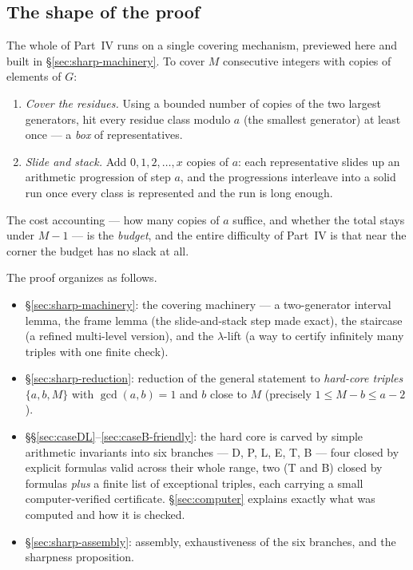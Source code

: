 \documentclass[11pt,reqno]{amsart}
\theoremstyle{plain}
\theoremstyle{definition}
\theoremstyle{remark}
\begin{document}
\subsection{The shape of the proof}\label{sec:sharp-shape}

The whole of Part~IV runs on a single covering mechanism, previewed here and built
in \S\ref{sec:sharp-machinery}. To cover $M$ consecutive integers with copies of
elements of $G$:

\begin{enumerate}
\item \emph{Cover the residues.} Using a bounded number of copies of the two
      largest generators, hit every residue class modulo $a$ (the smallest
      generator) at least once --- a \emph{box} of representatives.
\item \emph{Slide and stack.} Add $0, 1, 2, \dots, x$ copies of $a$: each
      representative slides up an arithmetic progression of step $a$, and the
      progressions interleave into a solid run once every class is represented and
      the run is long enough.
\end{enumerate}

The cost accounting --- how many copies of $a$ suffice, and whether the total stays
under $M - 1$ --- is the \emph{budget}, and the entire difficulty of Part~IV is
that near the corner the budget has no slack at all.

The proof organizes as follows.
\begin{itemize}
\item \S\ref{sec:sharp-machinery}: the covering machinery --- a two-generator
      interval lemma, the frame lemma (the slide-and-stack step made exact), the
      staircase (a refined multi-level version), and the $\lambda$-lift (a way to
      certify infinitely many triples with one finite check).
\item \S\ref{sec:sharp-reduction}: reduction of the general statement to
      \emph{hard-core triples} $\{a, b, M\}$ with $\gcd(a,b) = 1$ and $b$ close to
      $M$ (precisely $1 \le M - b \le a - 2$).
\item \S\S\ref{sec:caseDL}--\ref{sec:caseB-friendly}: the hard core is carved by
      simple arithmetic invariants into six branches --- D, P, L, E, T, B ---
      four closed by explicit formulas valid across their whole range, two (T and
      B) closed by formulas \emph{plus} a finite list of exceptional triples,
      each carrying a small computer-verified certificate. \S\ref{sec:computer}
      explains exactly what was computed and how it is checked.
\item \S\ref{sec:sharp-assembly}: assembly, exhaustiveness of the six branches,
      and the sharpness proposition.
\end{itemize}
\end{document}
